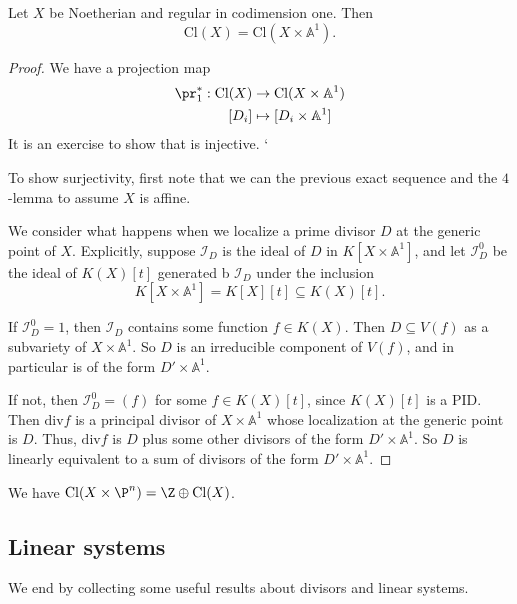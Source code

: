 \documentclass[a4paper]{article}
\newcommand\A{\mathbb{A}}
\renewcommand\div{\mathrm{div}}
\newcommand\Cl{\mathrm{Cl}}
\begin{document}
\begin{prop}
  Let $X$ be Noetherian and regular in codimension one. Then
  \[
    \Cl(X) = \Cl(X \times \A^1).
  \]
\end{prop}

\begin{proof}
  We have a projection map
  \begin{align*}
    \pr_1^*: \Cl(X) &\to \Cl(X \times \A^1)\\
    [D_i] &\mapsto [D_i \times \A^1]
  \end{align*}
  It is an exercise to show that is injective. `

  To show surjectivity, first note that we can the previous exact sequence and the $4$-lemma to assume $X$ is affine.

  We consider what happens when we localize a prime divisor $D$ at the generic point of $X$. Explicitly, suppose $\mathcal{I}_D$ is the ideal of $D$ in $K[X \times \A^1]$, and let $\mathcal{I}_D^0$ be the ideal of $K(X)[t]$ generated b $\mathcal{I}_D$ under the inclusion
  \[
    K[X \times \A^1] = K[X][t] \subseteq K(X) [t].
  \]

  If $\mathcal{I}_D^0 = 1$, then $\mathcal{I}_D$ contains some function $f \in K(X)$. Then $D \subseteq V(f)$ as a subvariety of $X \times \A^1$. So $D$ is an irreducible component of $V(f)$, and in particular is of the form $D' \times \A^1$.

  If not, then $\mathcal{I}_D^0 = (f)$ for some $f \in K(X)[t]$, since $K(X)[t]$ is a PID. Then $\div f$ is a principal divisor of $X \times \A^1$ whose localization at the generic point is $D$. Thus, $\div f$ is $D$ plus some other divisors of the form $D' \times \A^1$. So $D$ is linearly equivalent to a sum of divisors of the form $D' \times \A^1$.
\end{proof}

\begin{ex}
  We have $\Cl(X \times \P^n) = \Z \oplus \Cl(X)$.
\end{ex}

\subsection{Linear systems}
We end by collecting some useful results about divisors and linear systems.
\end{document}
